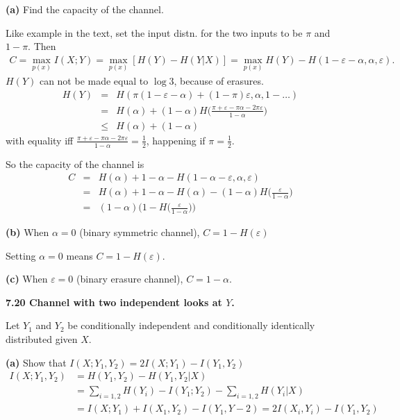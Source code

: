 \documentclass[10pt]{article}
\begin{document}
\begin{tiny}
\begin{multicols}{3}
\textbf{(a)} Find the capacity of the channel.

Like example in the text, set the input distn. for the two inputs to be $\pi$ and $1-\pi$. Then
\begin{align*}
    C = \max_{p(x)}I(X;Y) = \max_{p(x)}[H(Y) - H(Y|X)] = \max_{p(x)}H(Y) - H(1-\varepsilon-\alpha,\alpha,\varepsilon).
\end{align*}
$H(Y)$ can not be made equal to $\log 3$, because of erasures. 
\begin{eqnarray*}
    H(Y) &=& H( \pi(1-\varepsilon-\alpha) + (1-\pi)\varepsilon,\alpha, 1 - \dots)\\ %
    &=& H(\alpha) + (1-\alpha)H\bigg(\frac{\pi+\varepsilon -\pi\alpha-2\pi\varepsilon}{1-\alpha}\bigg) \\
    &\le& H(\alpha) + (1-\alpha)
\end{eqnarray*}
with equality iff $\frac{\pi+\varepsilon -\pi\alpha-2\pi\varepsilon}{1-\alpha} = \frac{1}{2}$, happening if $\pi = \frac{1}{2}$.

So the capacity of the channel is
\begin{eqnarray*}
    C &=& H(\alpha) + 1 - \alpha - H(1-\alpha-\varepsilon,\alpha,\varepsilon) \\
    &=& H(\alpha) + 1 - \alpha - H(\alpha) - (1-\alpha) H\bigg(\frac{\varepsilon}{1-\alpha}\bigg) \\
    &=& (1-\alpha) \bigg(1 - H\bigg(\frac{\varepsilon}{1-\alpha}\bigg)\bigg)
\end{eqnarray*}

\textbf{(b)} When $\alpha = 0$ (binary symmetric channel), $C = 1- H(\varepsilon)$

Setting $\alpha = 0$ means $C=1-H(\varepsilon)$.

\textbf{(c)} When $\varepsilon = 0$ (binary erasure channel), $C=1-\alpha$.

\textbf{\scriptsize 7.20 Channel with two independent looks at $Y$.}

Let $Y_1$ and $Y_2$ be conditionally independent and conditionally identically distributed given $X$.

\textbf{(a)} Show that $I(X;Y_1, Y_2) = 2I(X;Y_1) - I(Y_1,Y_2)$
\begin{align*}
    I(X;Y_1,Y_2) &= H(Y_1,Y_2) - H(Y_1,Y_2 | X) \\
    &= \sum_{i=1,2} H(Y_i) - I(Y_1;Y_2) - \sum_{i=1,2} H (Y_i|X) \\
    &= I(X;Y_1) + I(X_1,Y_2) - I(Y_1,Y-2) = 2I(X_i,Y_i) - I(Y_1,Y_2)
\end{align*}


\end{multicols}
\end{tiny}
\end{document}
